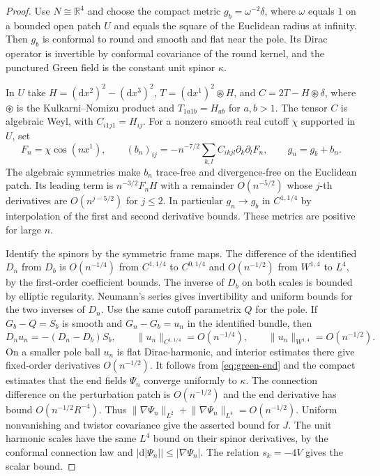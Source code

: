 \documentclass[11pt]{article}
\numberwithin{equation}{section}
\newcommand{\dd}{\mathrm{d}}
\newcommand{\RR}{\mathbb{R}}
\newcommand{\abs}[1]{\lvert #1\rvert}
\newcommand{\norm}[1]{\lVert #1\rVert}
\begin{document}
\begin{proof}
Use \(N\cong\RR^4\) and choose the compact metric \(g_b=\omega^{-2}\delta\),
where \(\omega\) equals \(1\) on a bounded open patch \(U\) and
equals the square of the Euclidean radius at infinity.
Then \(g_b\) is conformal to round and smooth and flat near the
pole. Its Dirac operator is invertible by conformal covariance of
the round kernel, and the punctured Green field is the constant unit
spinor \(\kappa\).

In \(U\) take \(H=(\dd x^2)^2-(\dd x^3)^2\),
\(T=(\dd x^1)^2\circledast H\), and \(C=2T-H\circledast\delta\),
where \(\circledast\) is the Kulkarni--Nomizu product and
\(T_{1a1b}=H_{ab}\) for \(a,b>1\). The tensor \(C\) is
algebraic Weyl, with \(C_{i1j1}=H_{ij}\). For a nonzero smooth
real cutoff \(\chi\) supported in \(U\), set
\[
 F_n=\chi\cos(nx^1),\qquad
 (b_n)_{ij}=-n^{-7/2}\sum_{k,l}C_{ikjl}\partial_k\partial_l F_n,
 \qquad g_n=g_b+b_n .
\]
The algebraic symmetries make \(b_n\) trace-free and divergence-free
on the Euclidean patch. Its leading term is \(n^{-3/2}F_n H\)
with a remainder \(O(n^{-5/2})\) whose \(j\)-th derivatives are
\(O(n^{j-5/2})\) for \(j\le2\). In particular \(g_n\to g_b\) in
\(C^{1,1/4}\) by interpolation of the first and second derivative
bounds. These metrics are positive for large \(n\).

Identify the spinors by the symmetric frame maps. The difference of
the identified \(D_n\) from \(D_b\) is \(O(n^{-1/4})\) from
\(C^{1,1/4}\) to \(C^{0,1/4}\) and \(O(n^{-1/2})\) from \(W^{1,4}\)
to \(L^4\), by the first-order coefficient bounds. The inverse of
\(D_b\) on both scales is bounded by elliptic regularity. Neumann's
series gives invertibility and uniform bounds for the two inverses
of \(D_n\). Use the same cutoff parametrix \(Q\) for the pole.
If \(G_b-Q=S_b\) is smooth and \(G_n-G_b=u_n\) in the identified
bundle, then
\[
 D_n u_n=-(D_n-D_b)S_b,\qquad
 \norm{u_n}_{C^{1,1/4}}=O(n^{-1/4}),\qquad
 \norm{u_n}_{W^{1,4}}=O(n^{-1/2}).
\]
On a smaller pole ball \(u_n\) is flat Dirac-harmonic, and interior
estimates there give fixed-order derivatives \(O(n^{-1/2})\).
It follows from \eqref{eq:green-end} and the compact estimates that
the end fields \(\Psi_n\) converge uniformly to \(\kappa\).
The connection difference on the perturbation patch is
\(O(n^{-1/2})\) and the end derivative has bound
\(O(n^{-1/2}R^{-4})\). Thus
\(\norm{\nabla\Psi_n}_{L^2}+\norm{\nabla\Psi_n}_{L^4}=O(n^{-1/2})\).
Uniform nonvanishing and twistor covariance give the asserted bound
for \(J\). The unit harmonic scales have the same \(L^4\) bound on
their spinor derivatives, by the conformal connection law and
\(\abs{\dd\abs{\Psi_n}}\le\abs{\nabla\Psi_n}\).
The relation \(s_k=-4V\) gives the scalar bound.


\end{proof}
\end{document}
